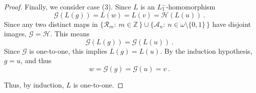 \documentclass[10pt,a4paper]{amsart}
\begin{document}
\begin{proof}
 
 
 
 Finally,  we consider case (3). 
 Since  $ L$  is  an $L_{  \mathbb{T}  }^-$-homomorphism 
\[
 \mathcal{G}    \left(  L(g)  \right)      =  L(w)   =  L(v)   =     \mathcal{H}    \left(  L(u)  \right)  
\     .
\]
Since   any two distinct maps in   
$  \big\lbrace   \mathcal{R}_m   :   \   m  \in  \mathbb{Z}   \,   \rbrace    \cup  
 \big\lbrace   \mathcal{A}_n   :   \   n   \in     \omega  \setminus  \lbrace 0,  1  \rbrace   \,   \rbrace         $ 
 have disjoint images,   
 $   \mathcal{G}    =    \mathcal{H}  $. 
 This means  
 \[
  \mathcal{G}    \left(  L(g)  \right)   =   \mathcal{G}    \left(  L(u)  \right) 
  \      .
 \] 
 Since     $    \mathcal{G}    $  is one-to-one,   this implies  
 $  L(g)  =  L(u)  $. 
 By the induction hypothesis,  $  g  =  u  $, and thus 
 \[
 w  =    \mathcal{G}    \left(  g \right)   =   \mathcal{G}    \left(  u \right)     =   v 
 \       .
 \]
 
 
 
 
 
 
 
 
 
Thus,  by induction,  $L$ is one-to-one.
\end{proof}
\end{document}
